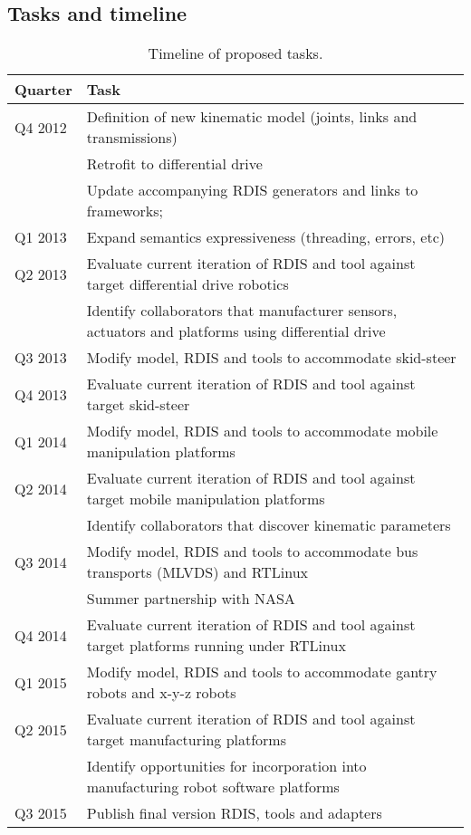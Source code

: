 \subsection{Tasks and timeline}
\begin{table}[htbp]
   \centering
   \begin{tabular}{|l|l|} 
   \hline
      {\bf Quarter}    & {\bf Task} \\
      \hline
      Q4 2012       &  Definition of new kinematic model (joints, links and transmissions)\\
      			&Retrofit to differential drive \\
      			&Update accompanying RDIS generators and links to frameworks;  \\
      Q1 2013       &Expand semantics expressiveness (threading, errors, etc)\\
      Q2 2013       & Evaluate current iteration of RDIS and tool against target differential drive robotics\\
     			&Identify collaborators that manufacturer sensors, actuators and platforms using differential drive\\
       Q3 2013	&Modify model, RDIS and tools to accommodate skid-steer\\
      Q4 2013       &Evaluate current iteration of RDIS and tool against target skid-steer \\
      Q1 2014       &Modify model, RDIS and tools to accommodate mobile manipulation platforms \\
      Q2 2014       &Evaluate current iteration of RDIS and tool against target mobile manipulation platforms \\
      			&Identify collaborators that discover kinematic parameters\\
      Q3 2014       & Modify model, RDIS and tools to accommodate bus transports (MLVDS) and RTLinux\\
      			&Summer partnership with NASA\\
      Q4 2014       &Evaluate current iteration of RDIS and tool against target platforms running under RTLinux\\
      Q1 2015       & Modify model, RDIS and tools to accommodate gantry robots and x-y-z robots\\
      Q2 2015       & Evaluate current iteration of RDIS and tool against target manufacturing platforms\\
      			& Identify opportunities for incorporation into manufacturing robot software platforms\\
      Q3 2015       & Publish final version RDIS, tools and adapters\\
      \hline
   \end{tabular}
   \caption{Timeline of proposed tasks.}
   \label{tab:tasks}
\end{table}
